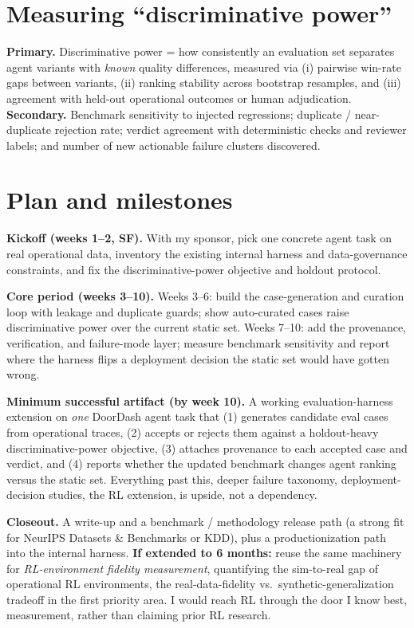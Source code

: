 \documentclass[letterpaper,11pt]{article}
\begin{document}
\section{Measuring ``discriminative power''}
\textbf{Primary.} Discriminative power = how consistently an evaluation set separates agent variants with \emph{known} quality differences, measured via (i) pairwise win-rate gaps between variants, (ii) ranking stability across bootstrap resamples, and (iii) agreement with held-out operational outcomes or human adjudication. \textbf{Secondary.} Benchmark sensitivity to injected regressions; duplicate / near-duplicate rejection rate; verdict agreement with deterministic checks and reviewer labels; and number of new actionable failure clusters discovered.

\section{Plan and milestones}
\textbf{Kickoff (weeks 1--2, SF).} With my sponsor, pick one concrete agent task on real operational data, inventory the existing internal harness and data-governance constraints, and fix the discriminative-power objective and holdout protocol.

\textbf{Core period (weeks 3--10).} Weeks 3--6: build the case-generation and curation loop with leakage and duplicate guards; show auto-curated cases raise discriminative power over the current static set. Weeks 7--10: add the provenance, verification, and failure-mode layer; measure benchmark sensitivity and report where the harness flips a deployment decision the static set would have gotten wrong.

\textbf{Minimum successful artifact (by week 10).} A working evaluation-harness extension on \emph{one} DoorDash agent task that (1) generates candidate eval cases from operational traces, (2) accepts or rejects them against a holdout-heavy discriminative-power objective, (3) attaches provenance to each accepted case and verdict, and (4) reports whether the updated benchmark changes agent ranking versus the static set. Everything past this, deeper failure taxonomy, deployment-decision studies, the RL extension, is upside, not a dependency.

\textbf{Closeout.} A write-up and a benchmark / methodology release path (a strong fit for NeurIPS Datasets \& Benchmarks or KDD), plus a productionization path into the internal harness. \textbf{If extended to 6 months:} reuse the same machinery for \emph{RL-environment fidelity measurement}, quantifying the sim-to-real gap of operational RL environments, the real-data-fidelity vs.\ synthetic-generalization tradeoff in the first priority area. I would reach RL through the door I know best, measurement, rather than claiming prior RL research.
\end{document}
